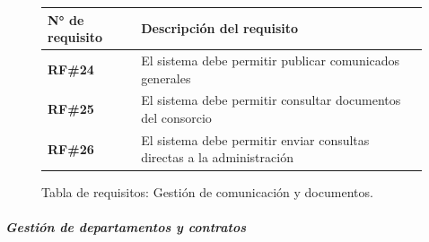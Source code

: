 \begin{figure}[H]
    \centering
    \begin{tabular}{|l|p{11cm}|}
    \hline
            \textbf{N° de requisito} 
        
        & 

            \textbf{Descripción del requisito} 
        
    \\ \hline
    
            \textbf{RF\#24} 
        
        & 

            El sistema debe permitir publicar comunicados generales 
        
    \\ \hline
    
            \textbf{RF\#25} 
        
        & 

            El sistema debe permitir consultar documentos del consorcio 
        
    \\ \hline
    
            \textbf{RF\#26} 
        
        & 

            El sistema debe permitir enviar consultas directas a la administración 
        
    \\ \hline
    \end{tabular}
    \caption{Tabla de requisitos: Gestión de comunicación y documentos.}
\end{figure}

\subparagraph{Gestión de departamentos y contratos}

